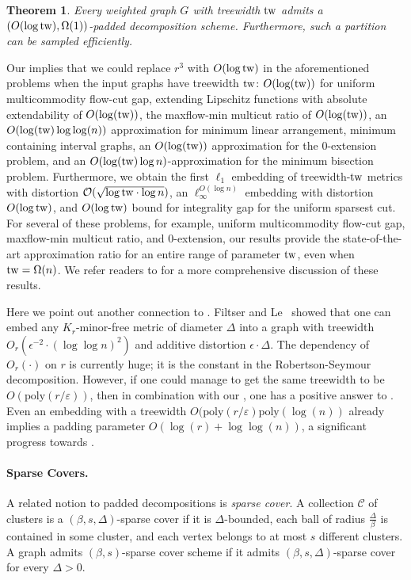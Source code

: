 \documentclass{article}
\newtheorem{theorem}{Theorem}\newtheorem{lemma}[theorem]{Lemma}\newtheorem{proposition}[theorem]{Proposition}\newtheorem{corollary}[theorem]{Corollary}\newtheorem{definition}[theorem]{Definition}\newtheorem{claim}[theorem]{Claim}\newtheorem{remark}[theorem]{Remark}\newtheorem{observation}[theorem]{Observation}\newtheorem{conjecture}[theorem]{Conjecture}\newtheorem{example}[theorem]{Example}
\newcommand{\tw}{{\rm tw}}
\newcommand{\poly}{\mathrm{poly}}
\def\eps{\varepsilon}
\begin{document}
\begin{theorem}\label{thm:paddedTW}
	Every weighted graph $G$ with treewidth $\tw$ admits a  $\left(O( \log\tw),\Omega(1)\right)$-padded decomposition scheme. Furthermore, such a partition can be sampled efficiently.
\end{theorem}	



Our  implies that we could replace $r^3$ with $O(\log \tw)$ in the aforementioned problems when the input graphs have treewidth $\tw$: $O(\log(\tw))$ for uniform multicommodity flow-cut gap, extending Lipschitz functions with absolute extendability of $O(\log(\tw))$,  the maxflow-min multicut ratio of $O(\log(\tw))$, an $O(\log(\tw) \log\log(n))$ approximation for minimum linear arrangement,  minimum containing interval graphs, an $O(\log(\tw))$ approximation for the 0-extension problem,  and an $O(\log(\tw)\log n)$-approximation for the minimum bisection problem. Furthermore, we obtain  the first $\ell_1$ embedding of treewidth-$\tw$ metrics with distortion $\mathcal{O}(\sqrt{\log \tw \cdot \log n})$, an $\ell^{O(\log n)}_\infty$ embedding with distortion $O(\log \tw)$, and $O(\log \tw)$ bound for integrality gap for the uniform sparsest cut.  For several of these problems, for example, uniform multicommodity flow-cut gap, maxflow-min multicut ratio, and 0-extension, our results provide the state-of-the-art approximation ratio for an entire range of parameter $\tw$, even when $\tw = \Omega(n)$.  We refer readers to  for a more comprehensive discussion of these results. 

Here we point out another connection to . Filtser and Le~\cite{FL22} showed that one can embed any $K_r$-minor-free metric of diameter $\Delta$ into a graph with treewidth $O_r(\epsilon^{-2}\cdot(\log\log n)^2)$ and additive distortion $\epsilon\cdot \Delta$. The dependency of $O_r(\cdot)$ on $r$ is currently huge; it is the constant in the Robertson-Seymour decomposition. However, if one could manage to get the same treewidth to be $O(\poly(r/\eps))$, then in combination with our , one has a positive answer to . Even an embedding with a treewidth $O(\poly(r/\eps)\poly(\log(n))$ already implies a padding parameter $O(\log(r) + \log\log(n))$, a significant progress towards . 

\paragraph*{Sparse Covers.~}
A related notion to padded decompositions is \emph{sparse cover}.
A collection $\mathcal{C}$ of clusters is a $(\beta,s,\Delta)$-sparse cover if it is $\Delta$-bounded, each ball of radius $\frac\Delta\beta$ is contained in some cluster, and each vertex belongs to at most $s$ different clusters. 
A graph admits $(\beta,s)$-sparse cover scheme if it admits $(\beta,s,\Delta)$-sparse cover for every $\Delta>0$.
\end{document}
